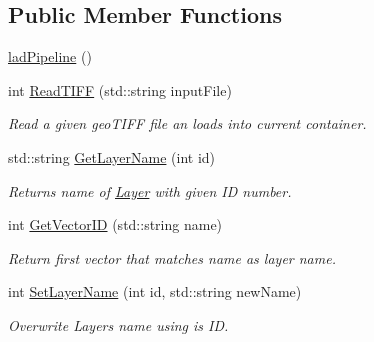\subsection*{Public Member Functions}
\begin{DoxyCompactItemize}
\item 
\hyperlink{classlad_1_1lad_pipeline_a47ebdd8f4797a0a7ea562682e2f311c3}{lad\+Pipeline} ()
\item 
int \hyperlink{classlad_1_1lad_pipeline_a60959c4c046e112741f87fa37fa08d9b}{Read\+T\+I\+FF} (std\+::string input\+File)
\begin{DoxyCompactList}\small\item\em Read a given geo\+T\+I\+FF file an loads into current container. \end{DoxyCompactList}\item 
std\+::string \hyperlink{classlad_1_1lad_pipeline_a10c0af216e3004e054d351b9f517408b}{Get\+Layer\+Name} (int id)
\begin{DoxyCompactList}\small\item\em Returns name of \hyperlink{classlad_1_1_layer}{Layer} with given ID number. \end{DoxyCompactList}\item 
int \hyperlink{classlad_1_1lad_pipeline_a6e4748a05ef0346e1912118496931523}{Get\+Vector\+ID} (std\+::string name)
\begin{DoxyCompactList}\small\item\em Return first vector that matches \textquotesingle{}name\textquotesingle{} as layer name. \end{DoxyCompactList}\item 
int \hyperlink{classlad_1_1lad_pipeline_a05a4d4197caa86b14bbbfe53237bfab0}{Set\+Layer\+Name} (int id, std\+::string new\+Name)
\begin{DoxyCompactList}\small\item\em Overwrite Layers name using is ID. \end{DoxyCompactList}\end{DoxyCompactItemize}
